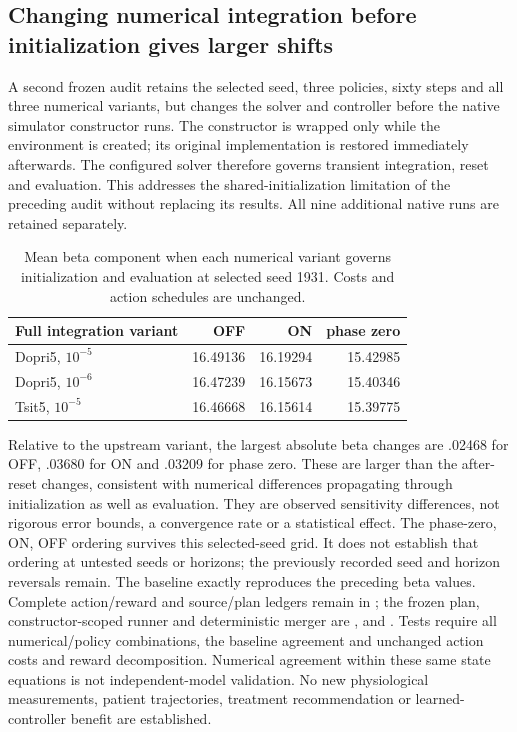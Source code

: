 \subsection{Changing numerical integration before initialization gives larger shifts}
A second frozen audit retains the selected seed, three policies, sixty steps and all three numerical variants, but changes the solver and controller before the native simulator constructor runs. The constructor is wrapped only while the environment is created; its original implementation is restored immediately afterwards. The configured solver therefore governs transient integration, reset and evaluation. This addresses the shared-initialization limitation of the preceding audit without replacing its results. All nine additional native runs are retained separately.
\begin{table}[ht]\centering
\caption{Mean beta component when each numerical variant governs initialization and evaluation at selected seed 1931. Costs and action schedules are unchanged.}
\begin{tabular}{lrrr}\hline
Full integration variant & OFF & ON & phase zero\\\hline
Dopri5, $10^{-5}$ &16.49136&16.19294&15.42985\\
Dopri5, $10^{-6}$ &16.47239&16.15673&15.40346\\
Tsit5, $10^{-5}$ &16.46668&16.15614&15.39775\\\hline
\end{tabular}\end{table}


Relative to the upstream variant, the largest absolute beta changes are .02468 for OFF, .03680 for ON and .03209 for phase zero. These are larger than the after-reset changes, consistent with numerical differences propagating through initialization as well as evaluation. They are observed sensitivity differences, not rigorous error bounds, a convergence rate or a statistical effect. The phase-zero, ON, OFF ordering survives this selected-seed grid. It does not establish that ordering at untested seeds or horizons; the previously recorded seed and horizon reversals remain.
The baseline exactly reproduces the preceding beta values. Complete action/reward and source/plan ledgers remain in ; the frozen plan, constructor-scoped runner and deterministic merger are ,  and . Tests require all numerical/policy combinations, the baseline agreement and unchanged action costs and reward decomposition. Numerical agreement within these same state equations is not independent-model validation. No new physiological measurements, patient trajectories, treatment recommendation or learned-controller benefit are established.
